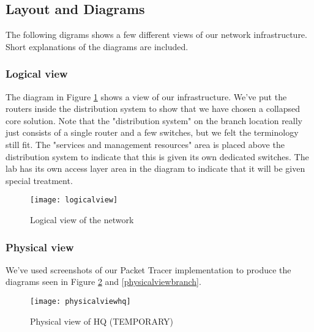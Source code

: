 \subsection{Layout and Diagrams}


The following digrams shows a few different views of our network infrastructure. Short explanations of the diagrams are included.

\subsubsection{Logical view}


The diagram in Figure \ref{logicalview} shows a view of our infrastructure. We've put the routers inside the distribution system to show that we have chosen a collapsed core solution. Note that the "distribution system" on the branch location really just consists of a single router and a few switches, but we felt the terminology still fit. The "services and management resources" area is placed above the distribution system to indicate that this is given its own dedicated switches. The lab has its own access layer area in the diagram to indicate that it will be given special treatment.

\begin{figure}[H]
\caption{Logical view of the network}
\centreing
\texttt{[image: logicalview]}
\label{logicalview}
\end{figure}

\subsubsection{Physical view}

We've used screenshots of our Packet Tracer implementation to produce the diagrams seen in Figure \ref{physicalviewhq} and \ref{physicalviewbranch}.



\begin{figure}[H]
\caption{Physical view of HQ (TEMPORARY)}
\centreing
\texttt{[image: physicalviewhq]}
\label{physicalviewhq}
\end{figure}

